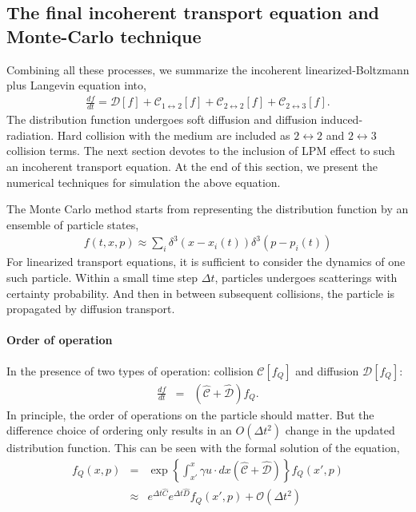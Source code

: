 \subsection{The final incoherent transport equation and Monte-Carlo technique}
Combining all these processes, we summarize the incoherent linearized-Boltzmann plus Langevin equation into,
\begin{eqnarray}
\frac{df}{dt} = \mathcal{D}[f] + \mathcal{C}_{1\leftrightarrow 2}[f] + \mathcal{C}_{2\leftrightarrow 2}[f] + \mathcal{C}_{2\leftrightarrow 3}[f].
\end{eqnarray}
The distribution function undergoes soft diffusion and diffusion induced-radiation. 
Hard collision with the medium are included as $2\leftrightarrow 2$ and $2\leftrightarrow 3$ collision terms.
The next section devotes to the inclusion of LPM effect to such an incoherent transport equation.
At the end of this section, we present the numerical techniques for simulation the above equation.

The Monte Carlo method starts from representing the distribution function by an ensemble of particle states,
\begin{eqnarray}
f(t,x,p) \approx \sum_{i} \delta^3(x-x_i(t)) \delta^3(p-p_i(t))
\end{eqnarray}
For linearized transport equations, it is sufficient to consider the dynamics of one such particle.
Within a small time step $\Delta t$, particles undergoes scatterings with certainty probability.
And then in between subsequent collisions, the particle is propagated by diffusion transport.

\paragraph{Order of operation} In the presence of two types of operation: collision $\mathcal{C}[f_Q]$ and diffusion $\mathcal{D}[f_Q]$:
\begin{eqnarray}
\nonumber
  \frac{df}{dt}  &=& 
\left( \mathcal{\hat{C}} + \mathcal{\hat{D}} \right) f_Q.
\end{eqnarray}
In principle, the order of operations on the particle should matter.
But the difference choice of ordering only results in an $O(\Delta t^2)$ change in the updated distribution function.
This can be seen with the formal solution of the equation,
\begin{eqnarray}
\nonumber
f_Q(x,p) &=& \exp\left\{ \int_{x'}^x \gamma u \cdot dx \left( \mathcal{\hat{C}} + \mathcal{\hat{D}} \right) \right\} f_Q(x',p)\\
&\approx & e^{\Delta t \hat{C}}e^{\Delta t \hat{D}} f_Q(x', p) + \mathcal{O}(\Delta t^2)
\end{eqnarray}

